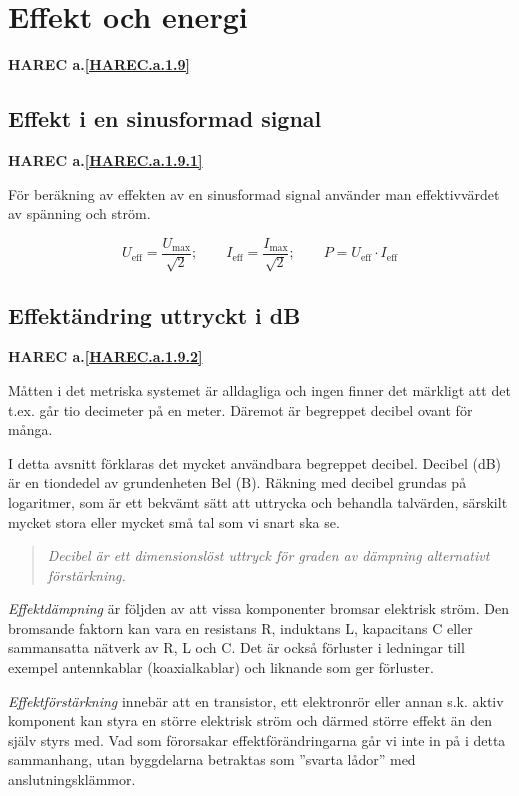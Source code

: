\section{Effekt och energi}
\textbf{HAREC a.\ref{HAREC.a.1.9}\label{myHAREC.a.1.9}}
\label{effect och energi}

\subsection{Effekt i en sinusformad signal}
\textbf{HAREC a.\ref{HAREC.a.1.9.1}\label{myHAREC.a.1.9.1}}

För beräkning av effekten av en sinusformad signal använder man effektivvärdet
av spänning och ström.

\[
	U_{\mathrm{eff}} = \frac{U_{\mathrm{max}}}{\sqrt{2}}; \qquad
	I_{\mathrm{eff}} = \frac{I_{\mathrm{max}}}{\sqrt{2}}; \qquad
	P = U_{\mathrm{eff}} \cdot I_{\mathrm{eff}}
\]

\subsection{Effektändring uttryckt i dB}
\textbf{HAREC a.\ref{HAREC.a.1.9.2}\label{myHAREC.a.1.9.2}}
\label{decibel}

Måtten i det metriska systemet är alldagliga och ingen finner det märkligt att
det t.ex. går tio decimeter på en meter. Däremot är begreppet decibel ovant för många.

I detta avsnitt förklaras det mycket användbara begreppet decibel.
Decibel (dB) är en tiondedel av grundenheten Bel (B). Räkning med decibel grundas 
på logaritmer, som är ett bekvämt sätt att uttrycka och behandla talvärden, 
särskilt mycket stora eller mycket små tal som vi snart ska se.

\begin{quote}
	\emph{Decibel är ett dimensionslöst uttryck för graden av dämpning alternativt
		förstärkning.}
\end{quote}

\emph{Effektdämpning} är följden av att vissa komponenter bromsar elektrisk
ström. Den bromsande faktorn kan vara en resistans R, induktans L, kapacitans C eller
sammansatta nätverk av R, L och C. Det är också förluster i ledningar till exempel
antennkablar (koaxialkablar) och liknande som ger förluster.

\emph{Effektförstärkning} innebär att en transistor, ett elektronrör eller
annan s.k. aktiv komponent kan styra en större elektrisk ström och därmed
större effekt än den själv styrs med.
Vad som förorsakar effektförändringarna går vi inte in på i detta sammanhang,
utan byggdelarna betraktas som ''svarta lådor'' med anslutningsklämmor.

